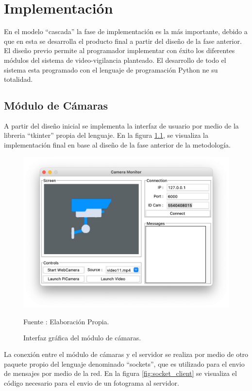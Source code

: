 \chapter{Implementación}
En el modelo ``cascada'' la fase de implementación es la más importante, debido a que en esta se desarrolla el producto final a partir del diseño de la fase anterior. El diseño previo permite al programador implementar con éxito los diferentes módulos del sistema de video-vigilancia planteado. El desarrollo de todo el sistema esta programado con el lenguaje de programación Python ne su totalidad.

\section{Módulo de Cámaras}
A partir del diseño inicial se implementa la interfaz de usuario por medio de la libreria ``tkinter'' propia del lenguaje. En la figura \ref{fig:camera_screen}, se visualiza la implementación final en base al diseño de la fase anterior de la metodología.\\

\begin{figure}[H]
    \begin{center}
        \includegraphics[width=12cm]{img/capitulo_5/camera_interface.png}
        \caption{Interfaz gráfica del módulo de cámaras.}
        Fuente : Elaboración Propia.
        \label{fig:camera_screen}
    \end{center}
\end{figure}

La conexión entre el módulo de cámaras y el servidor se realiza por medio de otro paquete propio del lenguaje denominado ``sockets'', que es utilizado para el envio de mensajes por medio de la red. En la figura \ref{fig:socket_client} se visualiza el código necesario para el envio de un fotograma al servidor.

